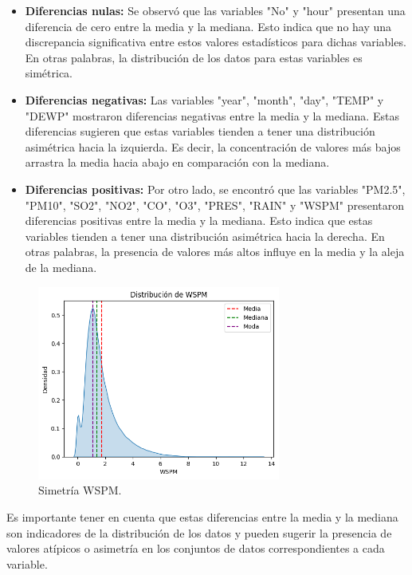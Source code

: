 \begin{itemize}
    \item \textbf{Diferencias nulas:} Se observó que las variables "No" y "hour" presentan una diferencia de cero entre la media y la mediana. Esto indica que no hay una discrepancia significativa entre estos valores estadísticos para dichas variables. En otras palabras, la distribución de los datos para estas variables es simétrica.
    \item \textbf{Diferencias negativas:} Las variables "year", "month", "day", "TEMP" y "DEWP" mostraron diferencias negativas entre la media y la mediana. Estas diferencias sugieren que estas variables tienden a tener una distribución asimétrica hacia la izquierda. Es decir, la concentración de valores más bajos arrastra la media hacia abajo en comparación con la mediana.
    \item \textbf{Diferencias positivas:} Por otro lado, se encontró que las variables "PM2.5", "PM10", "SO2", "NO2", "CO", "O3", "PRES", "RAIN" y "WSPM" presentaron diferencias positivas entre la media y la mediana. Esto indica que estas variables tienden a tener una distribución asimétrica hacia la derecha. En otras palabras, la presencia de valores más altos influye en la media y la aleja de la mediana.
\end{itemize}

\begin{figure}[htb] 
    \begin{center} 
        \includegraphics[width=8cm]{Papper IB/Images/simetria_wspm.png}
    \end{center} 
    \caption{Simetría WSPM.} 
    \label{fig:fig1} 
\end{figure} 

Es importante tener en cuenta que estas diferencias entre la media y la mediana son indicadores de la distribución de los datos y pueden sugerir la presencia de valores atípicos o asimetría en los conjuntos de datos correspondientes a cada variable.

